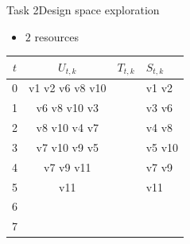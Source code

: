 \begin{frame}{Task 2}{Design space exploration}
  \begin{itemize}
    \item $2$ resources
  \end{itemize}
  \begin{solutionnoinc}
    \centering
    \tiny
    \begin{tabular}{c|c|l|l|}
    \hline$t$ & $U_{t, k}$ & $T_{t, k}$ & $S_{t, k}$ \\
    \hline 0 & v1 v2 v6 v8 v10 & & v1 v2 \\
    \hline 1 & v6 v8 v10 v3 & & v3 v6\\
    \hline 2 & v8 v10 v4 v7 & & v4 v8 \\
    \hline 3 & v7 v10 v9 v5 & & v5 v10 \\
    \hline 4 & v7 v9 v11 & & v7 v9 \\
    \hline 5 & v11 & & v11 \\
    \hline 6 &  & & \\
    \hline 7 &  & & \\
    \hline
    \end{tabular}
  \end{solutionnoinc}
\end{frame}

